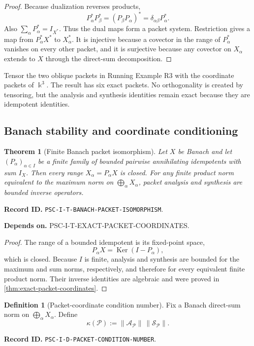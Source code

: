 \documentclass[11pt]{article}
\newtheorem{theorem}{Theorem}[section]
\theoremstyle{definition}
\newtheorem{definition}[definition]{Definition}
\theoremstyle{remark}
\newcommand{\bbk}{\Bbbk}
\newcommand{\Pcal}{\mathcal P}
\newcommand{\Ker}{\operatorname{Ker}}
\newcommand{\RecordID}[1]{\par\smallskip\noindent\begingroup\footnotesize\color{PSCGray}\raggedright\textbf{Record ID.} \nolinkurl{#1}.\par\endgroup}
\newcommand{\Depends}[1]{\par\noindent\begingroup\footnotesize\color{PSCGray}\raggedright\textbf{Depends on.} #1\par\endgroup}
\begin{document}
\begin{proof}
Because dualization reverses products,
\[
P_\alpha^*P_\beta^*=(P_\beta P_\alpha)^*
=\delta_{\alpha\beta}P_\alpha^*.
\]
Also \(\sum_\alpha P_\alpha^*=I_{X^*}\).  Thus the dual maps form a packet system.  Restriction gives a map from \(P_\alpha^*X^*\) to \(X_\alpha^*\).  It is injective because a covector in the range of \(P_\alpha^*\) vanishes on every other packet, and it is surjective because any covector on \(X_\alpha\) extends to \(X\) through the direct-sum decomposition.
\end{proof}

\begin{microexample}[title={Tensoring the oblique packet split}]
Tensor the two oblique packets in Running Example R3 with the coordinate packets of \(\bbk^3\).  The result has six exact packets.  No orthogonality is created by tensoring, but the analysis and synthesis identities remain exact because they are idempotent identities.
\end{microexample}

\subsection{Banach stability and coordinate conditioning}
\begin{theorem}[Finite Banach packet isomorphism]
\label{thm:banach-packets}
Let $X$ be Banach and let $(P_\alpha)_{\alpha\in I}$ be a finite family of bounded pairwise annihilating idempotents with sum $I_X$.  Then every range $X_\alpha=P_\alpha X$ is closed.  For any finite product norm equivalent to the maximum norm on $\bigoplus_\alpha X_\alpha$, packet analysis and synthesis are bounded inverse operators.
\end{theorem}
\RecordID{PSC-I-T-BANACH-PACKET-ISOMORPHISM}
\Depends{PSC-I-T-EXACT-PACKET-COORDINATES.}

\begin{proof}
The range of a bounded idempotent is its fixed-point space,
\[
P_\alpha X=\Ker(I-P_\alpha),
\]
which is closed.  Because $I$ is finite, analysis and synthesis are bounded for the maximum and sum norms, respectively, and therefore for every equivalent finite product norm.  Their inverse identities are algebraic and were proved in \cref{thm:exact-packet-coordinates}.
\end{proof}

\begin{definition}[Packet-coordinate condition number]
\label{def:packet-condition-number}
Fix a Banach direct-sum norm on $\bigoplus_\alpha X_\alpha$.  Define
\[
\kappa(\Pcal):=
\|\mathcal A_{\Pcal}\|\,
\|\mathcal S_{\Pcal}\|.
\]
\end{definition}
\RecordID{PSC-I-D-PACKET-CONDITION-NUMBER}
\end{document}
